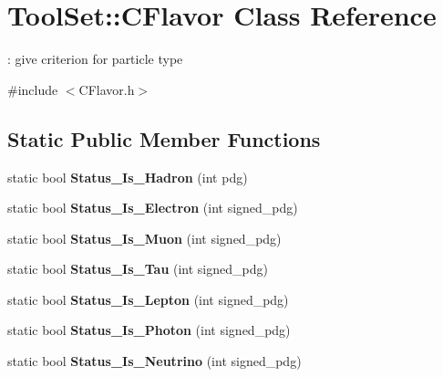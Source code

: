\hypertarget{classToolSet_1_1CFlavor}{
\section{ToolSet::CFlavor Class Reference}
\label{classToolSet_1_1CFlavor}
}


: give criterion for particle type  


{\ttfamily \#include $<$CFlavor.h$>$}\subsection*{Static Public Member Functions}
\begin{DoxyCompactItemize}
\item 
\hypertarget{classToolSet_1_1CFlavor_ac28da759e1e766e4ec1568ab5cf08154}{
static bool {\bfseries Status\_\-Is\_\-Hadron} (int pdg)}
\label{classToolSet_1_1CFlavor_ac28da759e1e766e4ec1568ab5cf08154}

\item 
\hypertarget{classToolSet_1_1CFlavor_ad4347d36438418d276865e8db5824c9a}{
static bool {\bfseries Status\_\-Is\_\-Electron} (int signed\_\-pdg)}
\label{classToolSet_1_1CFlavor_ad4347d36438418d276865e8db5824c9a}

\item 
\hypertarget{classToolSet_1_1CFlavor_adcd6a29bea85472ac52d97028def4bb6}{
static bool {\bfseries Status\_\-Is\_\-Muon} (int signed\_\-pdg)}
\label{classToolSet_1_1CFlavor_adcd6a29bea85472ac52d97028def4bb6}

\item 
\hypertarget{classToolSet_1_1CFlavor_a8cc1db857540f9fd610ea64b218d90b6}{
static bool {\bfseries Status\_\-Is\_\-Tau} (int signed\_\-pdg)}
\label{classToolSet_1_1CFlavor_a8cc1db857540f9fd610ea64b218d90b6}

\item 
\hypertarget{classToolSet_1_1CFlavor_aa982b9c4e90cb14ad3f476749de9d013}{
static bool {\bfseries Status\_\-Is\_\-Lepton} (int signed\_\-pdg)}
\label{classToolSet_1_1CFlavor_aa982b9c4e90cb14ad3f476749de9d013}

\item 
\hypertarget{classToolSet_1_1CFlavor_a466a56fa328a96bc9cf24d0014d570a6}{
static bool {\bfseries Status\_\-Is\_\-Photon} (int signed\_\-pdg)}
\label{classToolSet_1_1CFlavor_a466a56fa328a96bc9cf24d0014d570a6}

\item 
\hypertarget{classToolSet_1_1CFlavor_aefc846be6a676f2a7da2afb6d1c2ca2b}{
static bool {\bfseries Status\_\-Is\_\-Neutrino} (int signed\_\-pdg)}
\label{classToolSet_1_1CFlavor_aefc846be6a676f2a7da2afb6d1c2ca2b}


\end{DoxyCompactItemize}

